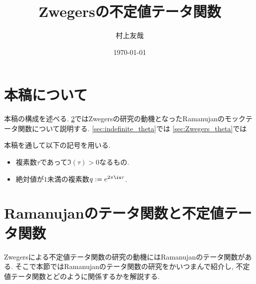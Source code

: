 \documentclass[11pt,b5paper,oneside,lualatex]{ltjsarticle} %
\numberwithin{equation}{section} %
\begin{document}

\title{Zwegersの不定値テータ関数}
\author{村上友哉}
\date{\today}

\maketitle

\tableofcontents


\section{本稿について} \label{sec:intro}




本稿の構成を述べる. 
\cref{sec:mock}ではZwegersの研究の動機となったRamanujanのモックテータ関数について説明する.
\cref{sec:indefinite_theta}では
\cref{sec:Zwegers_theta}では

本稿を通して以下の記号を用いる. 

\begin{symb}
	\begin{itemize}
		\item 複素数$ \tau $であって$ \Im(\tau) > 0 $なるもの.
		\item 絶対値が$ 1 $未満の複素数$ q := e^{2\pi\iu\tau} $.
	\end{itemize}
\end{symb}


\section{Ramanujanのテータ関数と不定値テータ関数} \label{sec:mock}


Zwegersによる不定値テータ関数の研究の動機にはRamanujanのテータ関数がある. 
そこで本節ではRamanujanのテータ関数の研究をかいつまんで紹介し, 不定値テータ関数とどのように関係するかを解説する. 

\end{document}
